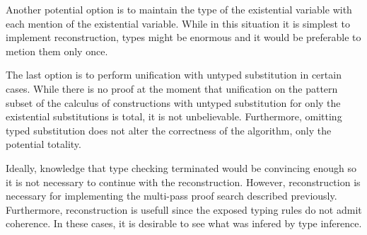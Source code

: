Another potential option is to maintain the type of the existential variable 
with each mention of the existential variable.  
While in this situation it is simplest to implement reconstruction, 
types might be enormous and it would be preferable to metion them only once.  

The last option is to perform unification with untyped substitution in certain cases.  
While there is no proof at the moment that unification on the pattern subset of 
the calculus of constructions with untyped substitution for only the existential substitutions
is total, it is not unbelievable.  Furthermore, omitting typed substitution does not alter
the correctness of the algorithm, only the potential totality.  

Ideally, knowledge that type checking terminated would be convincing enough
so it is not necessary to continue with the reconstruction.  However, reconstruction
is necessary for implementing the multi-pass proof search described previously.  
Furthermore, reconstruction is usefull since the exposed typing rules do not admit 
coherence.  In these cases, it is desirable to see what was infered by type inference.
